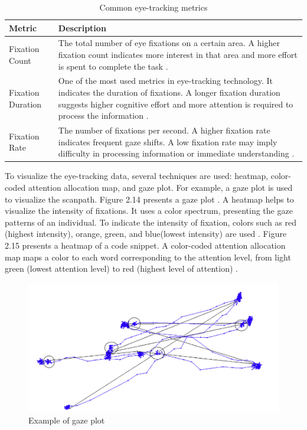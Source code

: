 \begin{table}[H]
\centering
\small %
\caption{Common eye-tracking metrics}
\label{tab:eye_tracking_metrics}
\begin{tabular}{p{} | p{}}
\hline
\rule{0pt}{1.2em}\textbf{Metric} & \textbf{Description} \\[0.5em]
\hline
\rule{0pt}{1.2em}Fixation Count & The total number of eye fixations on a certain area. A higher fixation count indicates more interest in that area and more effort is spent to complete the task \cite{obaidellah2018survey}. \\[0.5em]
\hline
\rule{0pt}{1.2em}Fixation Duration & One of the most used metrics in eye-tracking technology. It indicates the duration of fixations. A longer fixation duration suggests higher cognitive effort and more attention is required to process the information \cite{junior5005089understanding}. \\[0.5em]
\hline
\rule{0pt}{1.2em}Fixation Rate & The number of fixations per second. A higher fixation rate indicates frequent gaze shifts. A low fixation rate may imply difficulty in processing information or immediate understanding \cite{bauer2017indentations}. \\[0.5em]
\hline
\end{tabular}
\end{table}






To visualize the eye-tracking data, several techniques are used: heatmap, color-coded attention allocation map, and gaze plot. For example, a gaze plot is used to visualize the scanpath. Figure 2.14 presents a gaze plot \cite{sharafi2015systematic}. A heatmap helps to visualize the intensity of fixations. It uses a color spectrum, presenting the gaze patterns of an individual. 
To indicate the intensity of fixation, colors such as red (highest intensity), orange, green, and blue(lowest intensity) are used \cite{sharafi2015systematic}. Figure 2.15 presents a heatmap of a code snippet.  A color-coded attention allocation map maps a color to each word corresponding to the attention level, from light green (lowest attention level) to red (highest level of attention) \cite{sharafi2015systematic}.


\begin{figure} [H]
  \centering
  \includegraphics[scale=0.8]{figures/gaze.png}
  \caption{Example of gaze plot \cite[p. 9]{blignaut2019visualization}}
  \label{fig:AnhangsChor}
\end{figure}



